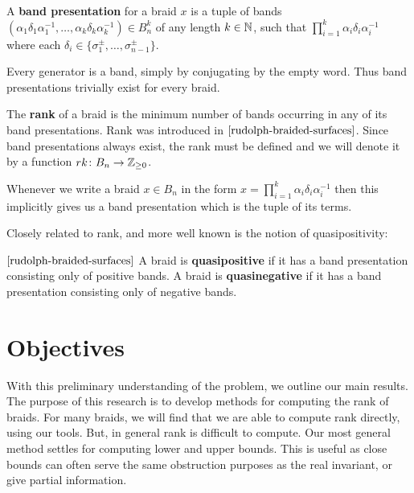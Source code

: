 \documentclass[12pt]{thesis}
\begin{document}
\begin{definition}
    A \textbf{band presentation} for a braid $x$ is a tuple of bands $(\alpha_{1}\delta_{1}\alpha_{1}^{-1},
    \ldots, \alpha_{k}\delta_{k}\alpha_{k}^{-1}) \in B_{n}^{k}$
    of any length $k \in \mathbb{N}$,
    such that $\prod_{i=1}^{k} \alpha_{i} \delta_{i} \alpha_{i}^{-1}$
    where each $\delta_{i} \in \{ \sigma_{1}^{\pm} ,\ldots, \sigma_{n-1}^{\pm} \}$.
\end{definition}

Every generator is a band, simply by conjugating by the empty word.
Thus band presentations trivially exist for every braid.
\begin{definition}
    The \textbf{rank} of a braid is the minimum number of bands
    occurring in any of its band presentations. 
    Rank was introduced in $\cite{rudolph-braided-surfaces}$.
    Since band presentations always exist,
    the rank must be defined and we will denote it by a function $rk \colon B_{n} \rightarrow \mathbb{Z}_{\geq 0}$.
\end{definition}

Whenever we write a braid $x \in B_{n}$ in the form $x = \prod_{i=1}^{k} \alpha_{i} \delta_{i} \alpha_{i}^{-1}$
then this implicitly gives us a band presentation which is the tuple of its terms.

Closely related to rank, and more well known is the notion of quasipositivity:
\begin{definition} $\cite{rudolph-braided-surfaces}$
    A braid is \textbf{quasipositive} if it has a
    band presentation consisting only of positive bands.
    A braid is \textbf{quasinegative} if it has a band
    presentation consisting only of negative bands.
\end{definition}

\section{Objectives}

With this preliminary understanding of the problem, we outline our main results.
The purpose of this research is to develop methods for computing the rank of braids.
For many braids, we will find that we are able to compute rank directly, using
our tools.
But, in general rank is difficult to compute.
Our most general method settles for computing lower and upper bounds.
This is useful
as close bounds can often serve the same obstruction
purposes as the real invariant,
or give partial information.
\end{document}
